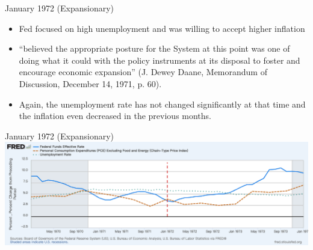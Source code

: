 \documentclass{beamer}
\begin{document}
\begin{frame}{January 1972 (Expansionary)}
  \begin{itemize}
    \item Fed focused on high unemployment and was willing to accept higher inflation
    \item “believed the appropriate posture for the System at this point was one of doing what it could with the policy instruments at its disposal to foster and encourage  economic expansion” (J. Dewey Daane, Memorandum of Discussion, December 14, 1971, p. 60).
    \item Again, the unemployment rate has not changed significantly at that time and the inflation even decreased in the previous months.
  \end{itemize}

\end{frame}
\begin{frame}{January 1972 (Expansionary)}
  \centering
  \includegraphics[width=1\linewidth]{Graphs/Jan1972Shocks.png}
\end{frame}
\end{document}
